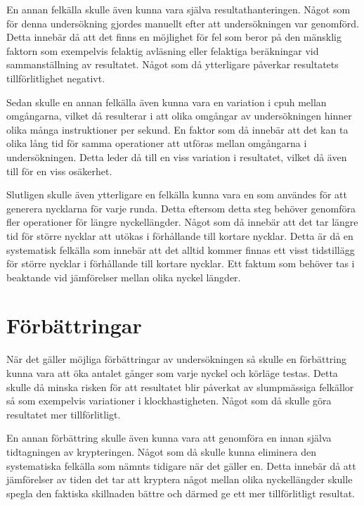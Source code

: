 En annan felkälla skulle även kunna vara själva resultathanteringen. Något som för denna undersökning gjordes manuellt efter att undersökningen var genomförd. Detta innebär då att
det finns en möjlighet för fel som beror på den mänsklig faktorn som exempelvis felaktig avläsning eller felaktiga beräkningar vid sammanställning av resultatet. Något som då ytterligare
påverkar resultatets tillförlitlighet negativt. %

Sedan skulle en annan felkälla även kunna vara en variation i \gls{cpuh} mellan omgångarna, vilket då resulterar i att olika omgångar av undersökningen hinner olika många instruktioner
per sekund. En faktor som då innebär att det kan ta olika lång tid för samma operationer att utföras mellan omgångarna i undersökningen. Detta leder då till en viss variation i resultatet,
vilket då även till för en viss osäkerhet. %

Slutligen skulle även ytterligare en felkälla kunna vara en som användes för att generera nycklarna för varje runda. Detta eftersom detta steg behöver genomföra fler operationer för längre nyckellängder.
Något som då innebär att det tar längre tid för större nycklar att utökas i förhållande till kortare nycklar. Detta är då en systematisk felkälla som innebär att det alltid kommer
finnas ett visst tidstillägg för större nycklar i förhållande till kortare nycklar. Ett faktum som behöver tas i beaktande vid jämförelser mellan olika nyckel längder. %

\section{Förbättringar} %
\label{sec:improvements}
När det gäller möjliga förbättringar av undersökningen så skulle en förbättring kunna vara att öka antalet gånger som varje nyckel och körläge testas. Detta skulle då
minska risken för att resultatet blir påverkat av slumpmässiga felkällor så som exempelvis variationer i klockhastigheten. Något som då skulle göra resultatet mer tillförlitligt. %

En annan förbättring skulle även kunna vara att genomföra en innan själva tidtagningen av krypteringen. Något som då skulle kunna eliminera den systematiska
felkälla som nämnts tidigare när det gäller en. Detta innebär då att jämförelser av tiden det tar att kryptera något mellan olika nyckellängder skulle spegla
den faktiska skillnaden bättre och därmed ge ett mer tillförlitligt resultat. %

